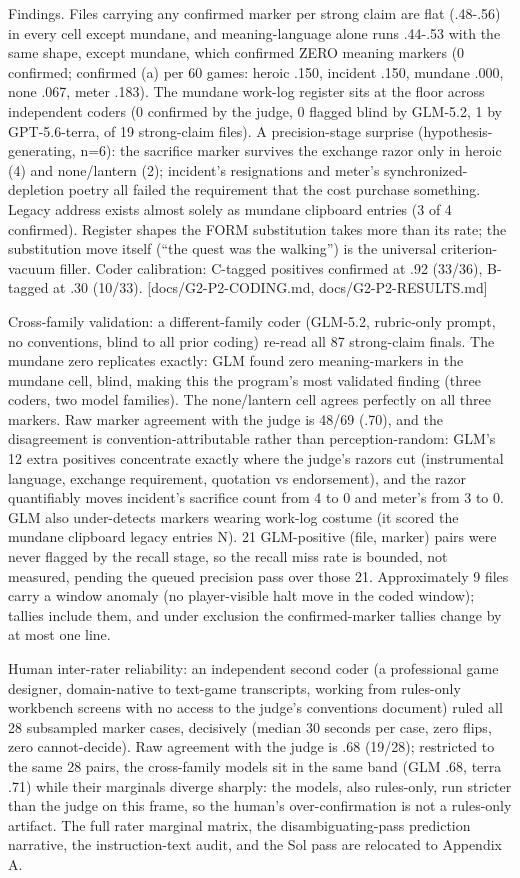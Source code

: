 \documentclass[11pt]{article}
\begin{document}
Findings. Files carrying any confirmed marker per strong claim are flat
(.48-.56) in every cell except mundane, and meaning-language alone runs
.44-.53 with the same shape, except mundane, which confirmed ZERO
meaning markers (0 confirmed; confirmed (a) per 60 games: heroic .150,
incident .150, mundane .000, none .067, meter .183). The mundane
work-log register sits at the floor across independent coders (0
confirmed by the judge, 0 flagged blind by GLM-5.2, 1 by GPT-5.6-terra,
of 19 strong-claim files). A precision-stage surprise
(hypothesis-generating, n=6): the sacrifice marker survives the exchange
razor only in heroic (4) and none/lantern (2); incident's resignations
and meter's synchronized-depletion poetry all failed the requirement
that the cost purchase something. Legacy address exists almost solely as
mundane clipboard entries (3 of 4 confirmed). Register shapes the FORM
substitution takes more than its rate; the substitution move itself
(``the quest was the walking'') is the universal criterion-vacuum
filler. Coder calibration: C-tagged positives confirmed at .92 (33/36),
B-tagged at .30 (10/33). {[}docs/G2-P2-CODING.md,
docs/G2-P2-RESULTS.md{]}

Cross-family validation: a different-family coder (GLM-5.2, rubric-only
prompt, no conventions, blind to all prior coding) re-read all 87
strong-claim finals. The mundane zero replicates exactly: GLM found zero
meaning-markers in the mundane cell, blind, making this the program's
most validated finding (three coders, two model families). The
none/lantern cell agrees perfectly on all three markers. Raw marker
agreement with the judge is 48/69 (.70), and the disagreement is
convention-attributable rather than perception-random: GLM's 12 extra
positives concentrate exactly where the judge's razors cut (instrumental
language, exchange requirement, quotation vs endorsement), and the razor
quantifiably moves incident's sacrifice count from 4 to 0 and meter's
from 3 to 0. GLM also under-detects markers wearing work-log costume (it
scored the mundane clipboard legacy entries N). 21 GLM-positive (file,
marker) pairs were never flagged by the recall stage, so the recall miss
rate is bounded, not measured, pending the queued precision pass over
those 21. Approximately 9 files carry a window anomaly (no
player-visible halt move in the coded window); tallies include them, and
under exclusion the confirmed-marker tallies change by at most one line.

Human inter-rater reliability: an independent second coder (a
professional game designer, domain-native to text-game transcripts,
working from rules-only workbench screens with no access to the judge's
conventions document) ruled all 28 subsampled marker cases, decisively
(median 30 seconds per case, zero flips, zero cannot-decide). Raw
agreement with the judge is .68 (19/28); restricted to the same 28
pairs, the cross-family models sit in the same band (GLM .68, terra .71)
while their marginals diverge sharply: the models, also rules-only, run
stricter than the judge on this frame, so the human's over-confirmation
is not a rules-only artifact. The full rater marginal matrix, the
disambiguating-pass prediction narrative, the instruction-text audit,
and the Sol pass are relocated to Appendix A.
\end{document}
